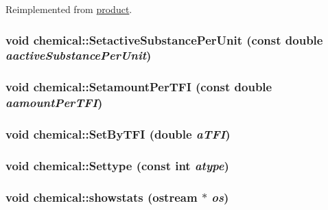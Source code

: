 Reimplemented from \hyperlink{classproduct_a1edb3e3d0619a2db8b8f1c95fed582ce}{product}.\hypertarget{classchemical_a3e09b6a3cbd7afe01c1bcd730270d8e1}{
\subsubsection[{SetactiveSubstancePerUnit}]{\setlength{\rightskip}{0pt plus 5cm}void chemical::SetactiveSubstancePerUnit (const double {\em aactiveSubstancePerUnit})}}
\label{classchemical_a3e09b6a3cbd7afe01c1bcd730270d8e1}
\hypertarget{classchemical_a501dcbea3e3489ec64c4b2f2b998da14}{
\subsubsection[{SetamountPerTFI}]{\setlength{\rightskip}{0pt plus 5cm}void chemical::SetamountPerTFI (const double {\em aamountPerTFI})}}
\label{classchemical_a501dcbea3e3489ec64c4b2f2b998da14}
\hypertarget{classchemical_a433a3abccb92ef058848eb9e6799934c}{
\subsubsection[{SetByTFI}]{\setlength{\rightskip}{0pt plus 5cm}void chemical::SetByTFI (double {\em aTFI})}}
\label{classchemical_a433a3abccb92ef058848eb9e6799934c}
\hypertarget{classchemical_ad86d720d3a4f1a2d8afa1ef4d53c566b}{
\subsubsection[{Settype}]{\setlength{\rightskip}{0pt plus 5cm}void chemical::Settype (const int {\em atype})}}
\label{classchemical_ad86d720d3a4f1a2d8afa1ef4d53c566b}
\hypertarget{classchemical_abad5f5665261d29f099d3defdac9364d}{
\subsubsection[{showstats}]{\setlength{\rightskip}{0pt plus 5cm}void chemical::showstats (ostream $\ast$ {\em os})}}
\label{classchemical_abad5f5665261d29f099d3defdac9364d}


